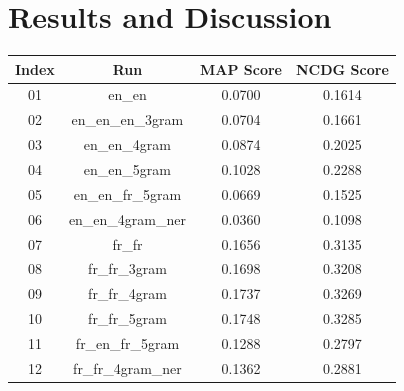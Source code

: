 \section{Results and Discussion}
\label{sec:results}


\begin{center}
    \begin{tabular}{ |c|c||c|c| } 
        \hline
        \textbf{Index} & \textbf{Run} & \textbf{MAP Score} & \textbf{NCDG Score}\\
        \hline\hline
        01 & en\_en & \cellcolor{red!30!white}0.0700 & \cellcolor{red!30!white}0.1614 \\
        \hline
        02 & en\_en\_en\_3gram & 0.0704 & 0.1661 \\
        \hline
        03 & en\_en\_4gram & 0.0874 & 0.2025 \\
        \hline
        04 & en\_en\_5gram & 0.1028 & 0.2288 \\
        \hline
        05 & en\_en\_fr\_5gram & \cellcolor{red!60!white}0.0669 & \cellcolor{red!60!white}0.1525 \\
        \hline
        06 & en\_en\_4gram\_ner & \cellcolor{red}0.0360 & \cellcolor{red}0.1098 \\
        \hline
        07 & fr\_fr & 0.1656 & 0.3135 \\
        \hline
        08 & fr\_fr\_3gram & \cellcolor{green!30!white}0.1698 & \cellcolor{green!30!white}0.3208 \\
        \hline
        09 & fr\_fr\_4gram & \cellcolor{green!60!white}0.1737 & \cellcolor{green!60!white}0.3269 \\
        \hline
        10 & fr\_fr\_5gram & \cellcolor{green}0.1748 & \cellcolor{green}0.3285 \\
        \hline
        11 & fr\_en\_fr\_5gram & 0.1288 & 0.2797 \\
        \hline
        12 & fr\_fr\_4gram\_ner & 0.1362 & 0.2881 \\
        \hline
    \end{tabular}
\end{center}

